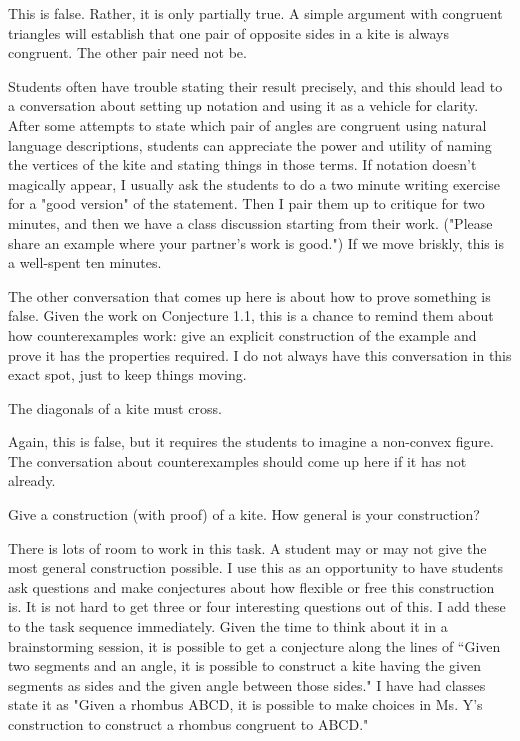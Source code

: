 \begin{annotation}
{
\color{blue}
This is false. Rather, it is only partially true. A simple argument with congruent triangles will establish that one pair of opposite sides in a kite is always congruent. The other pair need not be. 

Students often have trouble stating their result precisely, and this should lead to a conversation about setting up notation and using it as a vehicle for clarity. After some attempts to state which pair of angles are congruent using natural language descriptions, students can appreciate the power and utility of naming the vertices of the kite and stating things in those terms. If notation doesn't magically appear, I usually ask the students to do a two minute writing exercise for a "good version" of the statement. Then I pair them up to critique for two minutes, and then we have a class discussion starting from their work. ("Please share an example where your partner's work is good.") If we move briskly, this is a well-spent ten minutes.

The other conversation that comes up here is about how to prove something is false. Given the work on Conjecture 1.1, this is a chance to remind them about how counterexamples work: give an explicit construction of the example and prove it has the properties required. I do not always have this conversation in this exact spot, just to keep things moving.
}
\end{annotation}

\begin{conjecture}\label{conj:kite-diagonals-cross}
The diagonals of a kite must cross.
\end{conjecture}

\begin{annotation}
{
\color{blue}
Again, this is false, but it requires the students to imagine a non-convex figure. The conversation about counterexamples should come up here if it has not already.
}
\end{annotation}

\begin{problem}\label{prob:construct-kites}
Give a construction (with proof) of a kite.
How general is your construction?
\end{problem}

\begin{annotation}
{
\color{blue}
There is lots of room to work in this task. A student may or may not give the most general construction possible. I use this as an opportunity to have students ask questions and make conjectures about how flexible or free this construction is. It is not hard to get three or four interesting questions out of this. I add these to the task sequence immediately. Given the time to think about it in a brainstorming session, it is possible to get a conjecture along the lines of ``Given two segments and an angle, it is possible to construct a kite having the given segments as sides and the given angle between those sides." I have had classes state it as "Given a rhombus ABCD, it is possible to make choices in Ms. Y's construction to construct a rhombus congruent to ABCD."
}
\end{annotation}


